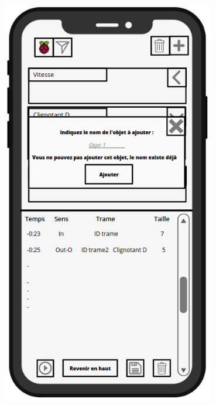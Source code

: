 \begin{minipage}{0.5\linewidth}
    \centering
    \includegraphics[width=0.7\textwidth]{sections/3_Exigences_specifiques/1_IHM/ihm/ecranCreationObjetErreur.png}
    \captionsetup{justification=centering}
    \label{ecran_creation_erreur_objet}
\end{minipage} \hfill
